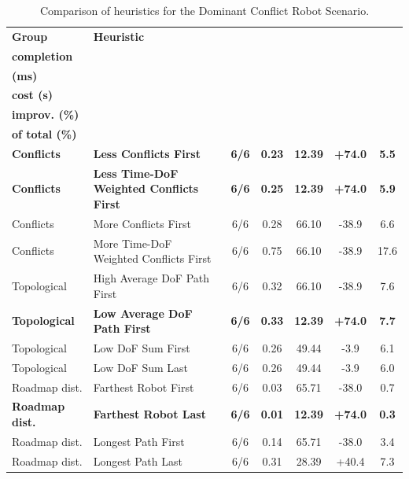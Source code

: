 \begin{table}[H]
\centering
\caption{Comparison of heuristics for the Dominant Conflict Robot Scenario.}
\label{tab:heuristics_dominant_conflict_robot}
\scriptsize
\setlength{\tabcolsep}{3pt}
\begin{tabular}{@{}llccccc@{}}
\toprule
\textbf{Group} &
\textbf{Heuristic} &
\makecell{\textbf{Robot}\\\textbf{completion}} &
\makecell{\textbf{t perm.}\\\textbf{(ms)}} &
\makecell{\textbf{Excess}\\\textbf{cost (s)}} &
\makecell{\textbf{Cost}\\\textbf{improv. (\%)}} &
\makecell{\textbf{Perm. time}\\\textbf{of total (\%)}} \\
\midrule

\textbf{Conflicts} & \textbf{Less Conflicts First} & \textbf{6/6} & \textbf{0.23} & \textbf{12.39} & \textbf{+74.0} & \textbf{5.5} \\
\textbf{Conflicts} & \textbf{Less Time-DoF Weighted Conflicts First} & \textbf{6/6} & \textbf{0.25} & \textbf{12.39} & \textbf{+74.0} & \textbf{5.9} \\
Conflicts & More Conflicts First & 6/6 & 0.28 & 66.10 & -38.9 & 6.6 \\
Conflicts & More Time-DoF Weighted Conflicts First & 6/6 & 0.75 & 66.10 & -38.9 & 17.6 \\

\midrule

Topological & High Average DoF Path First & 6/6 & 0.32 & 66.10 & -38.9 & 7.6 \\
\textbf{Topological} & \textbf{Low Average DoF Path First} & \textbf{6/6} & \textbf{0.33} & \textbf{12.39} & \textbf{+74.0} & \textbf{7.7} \\
Topological & Low DoF Sum First & 6/6 & 0.26 & 49.44 & -3.9 & 6.1 \\
Topological & Low DoF Sum Last & 6/6 & 0.26 & 49.44 & -3.9 & 6.0 \\

\midrule

Roadmap dist. & Farthest Robot First & 6/6 & 0.03 & 65.71 & -38.0 & 0.7 \\
\textbf{Roadmap dist.} & \textbf{Farthest Robot Last} & \textbf{6/6} & \textbf{0.01} & \textbf{12.39} & \textbf{+74.0} & \textbf{0.3} \\
Roadmap dist. & Longest Path First & 6/6 & 0.14 & 65.71 & -38.0 & 3.4 \\
Roadmap dist. & Longest Path Last & 6/6 & 0.31 & 28.39 & +40.4 & 7.3 \\


\end{tabular}
\end{table}
